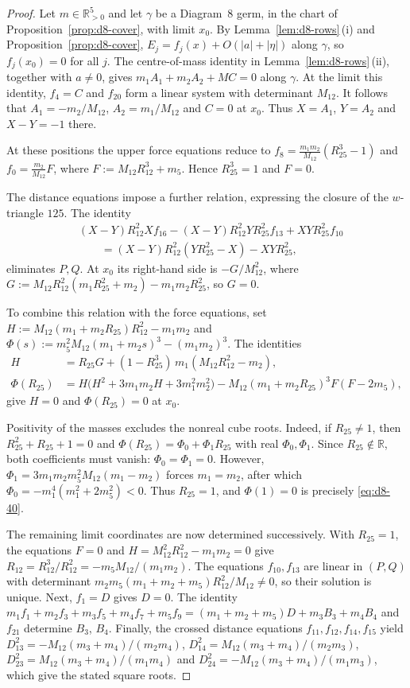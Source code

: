 \documentclass[11pt]{amsart}
\theoremstyle{definition}
\theoremstyle{remark}
\newcommand{\R}{\mathbb{R}}
\newcommand{\Rp}{\mathbb{R}_{>0}}
\begin{document}
\begin{proof}
Let $m\in\Rp^5$ and let $\gamma$ be a Diagram~8 germ, in the chart of
Proposition~\ref{prop:d8-cover}, with limit $x_0$.
By Lemma~\ref{lem:d8-rows}\,(i) and Proposition~\ref{prop:d8-cover},
$E_j=f_j(x)+O(|a|+|\eta|)$ along $\gamma$, so $f_j(x_0)=0$ for all $j$.
The centre-of-mass identity in Lemma~\ref{lem:d8-rows}\,(ii), together with
$a\ne0$, gives $m_1A_1+m_2A_2+MC=0$ along $\gamma$.  At the limit this identity,
$f_4=C$ and $f_{20}$ form a linear system with determinant $M_{12}$.
It follows that $A_1=-m_2/M_{12}$, $A_2=m_1/M_{12}$ and $C=0$ at $x_0$.
Thus $X=A_1$, $Y=A_2$ and $X-Y=-1$ there.

At these positions the upper force equations reduce to
$f_8=\frac{m_1m_2}{M_{12}}(R_{25}^3-1)$ and $f_0=\frac{m_2}{M_{12}}F$,
where $F:=M_{12}R_{12}^3+m_5$.  Hence $R_{25}^3=1$ and $F=0$.

The distance equations impose a further relation, expressing the closure of
the $w$-triangle $125$.  The identity
\begin{align*}
  &(X-Y)R_{12}^2Xf_{16}-(X-Y)R_{12}^2YR_{25}^2f_{13}+XYR_{25}^2f_{10}\\
  &\qquad=(X-Y)R_{12}^2(YR_{25}^2-X)-XYR_{25}^2,
\end{align*}
eliminates $P,Q$.  At $x_0$ its right-hand side is $-G/M_{12}^2$, where
$G:=M_{12}R_{12}^2(m_1R_{25}^2+m_2)-m_1m_2R_{25}^2$, so $G=0$.

To combine this relation with the force equations, set
$H:=M_{12}(m_1+m_2R_{25})R_{12}^2-m_1m_2$ and
$\Phi(s):=m_5^2M_{12}(m_1+m_2s)^3-(m_1m_2)^3$.  The identities
\begin{align*}
  H&=R_{25}G+(1-R_{25}^3)\,m_1(M_{12}R_{12}^2-m_2),\\
  \Phi(R_{25})&=H\bigl(H^2+3m_1m_2H+3m_1^2m_2^2\bigr)
  -M_{12}(m_1+m_2R_{25})^3F(F-2m_5),
\end{align*}
give $H=0$ and $\Phi(R_{25})=0$ at $x_0$.

Positivity of the masses excludes the nonreal cube roots.  Indeed, if
$R_{25}\ne1$, then $R_{25}^2+R_{25}+1=0$ and
$\Phi(R_{25})=\Phi_0+\Phi_1R_{25}$ with real $\Phi_0,\Phi_1$.  Since
$R_{25}\notin\R$, both coefficients must vanish: $\Phi_0=\Phi_1=0$.
However, $\Phi_1=3m_1m_2m_5^2M_{12}(m_1-m_2)$ forces $m_1=m_2$, after which
$\Phi_0=-m_1^4(m_1^2+2m_5^2)<0$.  Thus $R_{25}=1$, and $\Phi(1)=0$ is precisely
\eqref{eq:d8-40}.

The remaining limit coordinates are now determined successively.  With $R_{25}=1$,
the equations $F=0$ and $H=M_{12}^2R_{12}^2-m_1m_2=0$ give
$R_{12}=R_{12}^3/R_{12}^2=-m_5M_{12}/(m_1m_2)$.  The equations $f_{10},f_{13}$
are linear in $(P,Q)$ with determinant
$m_2m_5(m_1+m_2+m_5)R_{12}^2/M_{12}\ne0$, so their solution is unique.
Next, $f_1=D$ gives $D=0$.  The identity
$m_1f_1+m_2f_3+m_3f_5+m_4f_7+m_5f_9=(m_1+m_2+m_5)D+m_3B_3+m_4B_4$
and $f_{21}$ determine $B_3$, $B_4$.  Finally, the crossed distance equations
$f_{11},f_{12},f_{14},f_{15}$ yield
$D_{13}^2=-M_{12}(m_3+m_4)/(m_2m_4)$, $D_{14}^2=M_{12}(m_3+m_4)/(m_2m_3)$,
$D_{23}^2=M_{12}(m_3+m_4)/(m_1m_4)$ and $D_{24}^2=-M_{12}(m_3+m_4)/(m_1m_3)$,
which give the stated square roots.
\end{proof}
\end{document}
